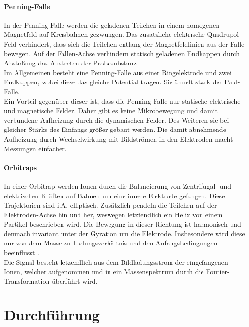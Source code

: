 \documentclass[numbers=noenddot,a4paper,notitlepage,twoside,BCOR15mm]{scrartcl}
\begin{document}
				\paragraph{Penning-Falle}
					In der Penning-Falle werden die geladenen Teilchen in einem homogenen Magnetfeld auf Kreisbahnen gezwungen. Das zusätzliche elektrische Quadrupol-Feld verhindert, dass sich die Teilchen entlang der Magnetfeldlinien aus der Falle bewegen. Auf der Fallen-Achse verhindern statisch geladenen Endkappen durch Abstoßung das Austreten der Probesubstanz.\\
					Im Allgemeinen besteht eine Penning-Falle aus einer Ringelektrode und zwei Endkappen, wobei diese das gleiche Potential tragen. Sie ähnelt stark der Paul-Falle.\\
					Ein Vorteil gegenüber dieser ist, dass die Penning-Falle nur statische elektrische und magnetische Felder. Daher gibt es keine Mikrobewegung und damit verbundene Aufheizung durch die dynamischen Felder. Des Weiteren sie bei gleicher Stärke des Einfangs größer gebaut werden. Die damit abnehmende Aufheizung durch Wechselwirkung mit Bildströmen in den Elektroden macht Messungen einfacher.	

				\paragraph{Orbitraps}
					In einer Orbitrap werden Ionen durch die Balancierung von Zentrifugal- und elektrischen Kräften auf Bahnen um eine innere Elektrode gefangen. Diese Trajektorien sind i.A. elliptisch. Zusätzlich pendeln die Teilchen auf der Elektroden-Achse hin und her, weswegen letztendlich ein Helix von einem Partikel beschrieben wird. Die Bewegung in dieser Richtung ist harmonisch und demnach invariant unter der Gyration um die Elektrode.  Insbesondere wird diese nur von dem Masse-zu-Ladungsverhältnis und den Anfangsbedingungen beeinflusst .\\
					Die Signal besteht letzendlich aus dem Bildladungsstrom der eingefangenen Ionen, welcher aufgenommen und in ein Massenspektrum durch die Fourier-Transformation überführt wird.

	\clearpage
	\section{Durchführung}
\end{document}
